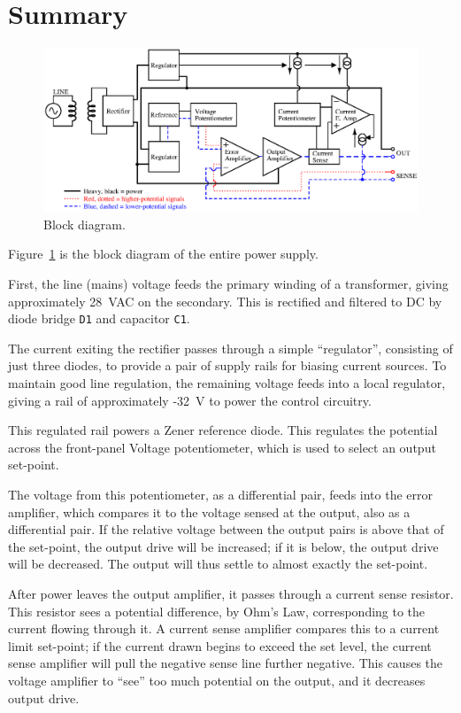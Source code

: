 \section{Summary}

\begin{figure}[H]
\centering
\includegraphics[width=5.5in]{sch/blockdiag}
\caption{Block diagram.}
\label{fig:blockdiag}
\end{figure}

\begin{multicols}{2}

Figure~\ref{fig:blockdiag} is the block diagram of the entire power supply.

First, the line (mains) voltage feeds the primary winding of a transformer,
giving approximately 28~VAC on the secondary.
This is rectified and filtered to DC by diode bridge \texttt{D1} and
capacitor \texttt{C1}.

The current exiting the rectifier passes through a simple ``regulator'',
consisting of just three diodes, to provide a pair of supply rails for
biasing current sources. To maintain good line regulation, the remaining
voltage feeds into a local regulator, giving a rail of approximately -32~V
to power the control circuitry.

This regulated rail powers a Zener reference diode. This regulates the
potential across the front-panel Voltage potentiometer, which is used to select
an output set-point.

The voltage from this potentiometer, as a differential pair, feeds into the
error amplifier, which compares it to the voltage sensed at the output, also as
a differential pair. If the relative voltage between the output pairs is above
that of the set-point, the output drive will be increased; if it is below, the
output drive will be decreased. The output will thus settle to almost exactly
the set-point.

After power leaves the output amplifier, it passes through a current sense
resistor. This resistor sees a potential difference, by Ohm's Law,
corresponding to the current flowing through it. A current sense amplifier
compares this to a current limit set-point; if the current drawn begins to
exceed the set level, the current sense amplifier will pull the negative sense
line further negative.  This causes the voltage amplifier to ``see'' too much
potential on the output, and it decreases output drive.


\end{multicols}
